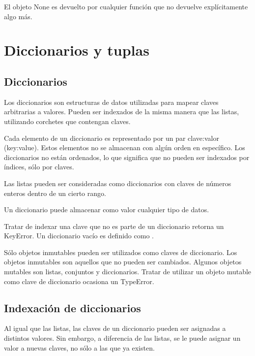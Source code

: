 \documentclass{report}
\begin{document}
El objeto None es devuelto por cualquier función que no devuelve explícitamente algo más.


\clearpage\chapter{Diccionarios y tuplas}

\section{Diccionarios}


Los diccionarios son estructuras de datos utilizadas para mapear claves arbitrarias a valores. Pueden ser indexados de la misma manera que las listas, utilizando corchetes que contengan claves.


Cada elemento de un diccionario es representado por un par clave:valor (key:value). Estos elementos no se almacenan con algún orden en específico. Los diccionarios no están ordenados, lo que significa que no pueden ser indexados por índices, sólo por claves.

Las listas pueden ser consideradas como diccionarios con claves de números enteros dentro de un cierto rango.


Un diccionario puede almacenar como valor cualquier tipo de datos.


Tratar de indexar una clave que no es parte de un diccionario retorna un KeyError.
Un diccionario vacío es definido como {}.



Sólo objetos inmutables pueden ser utilizados como claves de diccionario. Los objetos inmutables son aquellos que no pueden ser cambiados. Algunos objetos mutables son listas, conjuntos y diccionarios. Tratar de utilizar un objeto mutable como clave de diccionario ocasiona un TypeError.

\section{Indexación de diccionarios}

Al igual que las listas, las claves de un diccionario pueden ser asignadas a distintos valores. Sin embargo, a diferencia de las listas, se le puede asignar un valor a nuevas claves, no sólo a las que ya existen.
\end{document}
